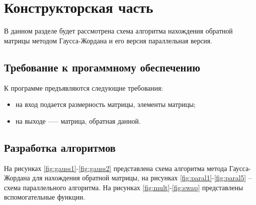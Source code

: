 \chapter{Конструкторская часть}

В данном разделе будет рассмотрена схема алгоритма нахождения обратной матрицы методом Гаусса-Жордана
и его версия параллельная версия.

\section{Требование к прогаммному обеспечению}

К программе предъявляются следующие требования:

\begin{itemize}
	\item на вход подается размерность матрицы, элементы матрицы;
	\item на выходе —-- матрица, обратная данной.
\end{itemize}

\section{Разработка алгоритмов}

На рисунках \ref{fig:gauss1}-\ref{fig:gauss2} представлена схема алгоритма
метода Гаусса-Жордана для нахождения обратной матрицы, на рисунках
\ref{fig:paral1}-\ref{fig:paral5} -- схема параллельного алгоритма.
На рисунках \ref{fig:mult}-\ref{fig:swap} представлены вспомогательные функции.

